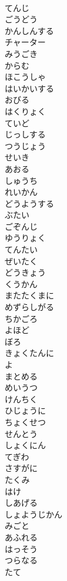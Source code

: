 \documentclass[8pt]{extreport}
\begin{document}
\begin{CJK}{UTF8}{min}
\\	てんじ
\\	ごうどう
\\	かんしんする
\\	チャーター
\\	みうごき
\\	からむ
\\	ほこうしゃ
\\	はいかいする
\\	おびる
\\	はくりょく
\\	ていど
\\	じっしする
\\	つうじょう
\\	せいき
\\	あおる
\\	しゅうち
\\	れいかん
\\	どうようする
\\	ぶたい
\\	ごぞんじ
\\	ゆうりょく
\\	てんたい
\\	ぜいたく
\\	どうきょう
\\	くうかん
\\	またたくまに
\\	めずらしがる
\\	ちかごろ
\\	よほど
\\	ぼろ
\\	きょくたんに
\\	よ
\\	まとめる
\\	めいうつ
\\	けんちく
\\	ひじょうに
\\	ちょくせつ
\\	せんとう
\\	しょくにん
\\	てぎわ
\\	さすがに
\\	たくみ
\\	はけ
\\	しあげる
\\	しょようじかん
\\	みごと
\\	あふれる
\\	はっそう
\\	つらなる
\\	たて

\end{CJK}
\end{document}

